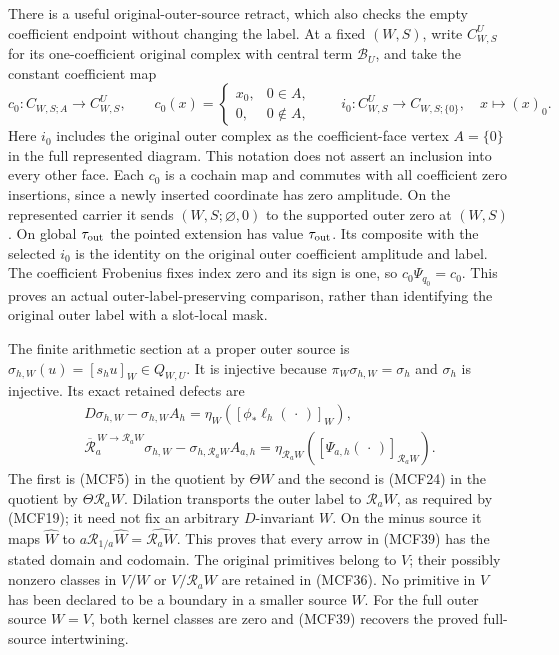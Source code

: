 \documentclass[11pt,a4paper]{article}
\begin{document}
There is a useful original-outer-source retract, which also checks the
empty coefficient endpoint without changing the label.  At a fixed
$(W,S)$, write $C_{W,S}^U$ for its one-coefficient original complex
with central term $\mathscr B_U$, and take the constant coefficient map
\[
c_0:C_{W,S;A}\longrightarrow C_{W,S}^U,\qquad
c_0(x)=\begin{cases}x_0,&0\in A,\\0,&0\notin A,
\end{cases}
\qquad
i_0:C_{W,S}^U\longrightarrow C_{W,S;\{0\}},\quad x\longmapsto(x)_0.
\tag{MCF38}
\]
Here $i_0$ includes the original outer complex as the coefficient-face
vertex $A=\{0\}$ in the full represented diagram.  This notation does
not assert an inclusion into every other face.  Each $c_0$ is a cochain
map and commutes with all coefficient zero insertions, since a newly
inserted coordinate has zero amplitude.  On the represented carrier
it sends $(W,S;\varnothing,0)$ to the supported outer zero at
$(W,S)$.  On global $\tau_{\rm out}$ the pointed extension
has value $\tau_{\rm out}$.  Its composite with the selected $i_0$
is the identity on the original outer coefficient amplitude and label.
The coefficient Frobenius fixes index zero and its sign is one, so
$c_0\Psi_{q_0}=c_0$.  This proves an actual outer-label-preserving
comparison, rather than identifying the original outer label with a
slot-local mask.

The finite arithmetic section at a proper outer source is
$\sigma_{h,W}(u)=[s_hu]_W\in Q_{W,U}$.  It is injective because
$\pi_W\sigma_{h,W}=\sigma_h$ and $\sigma_h$ is injective.
Its exact retained defects are
\[
\begin{gathered}
D\sigma_{h,W}-\sigma_{h,W}A_h
       =\eta_W([\phi_*\ell_h(\,\cdot\,)]_W),\\
\overline{\mathcal R}_a^{\,W\to\mathcal R_aW}\sigma_{h,W}
       -\sigma_{h,\mathcal R_aW}A_{a,h}
       =\eta_{\mathcal R_aW}([\Psi_{a,h}(\,\cdot\,)]_{\mathcal R_aW}).
\end{gathered}
\tag{MCF39}
\]
The first is (MCF5) in the quotient by $\Theta W$ and the second is
(MCF24) in the quotient by $\Theta\mathcal R_aW$.  Dilation transports
the outer label to $\mathcal R_aW$, as required by (MCF19); it need
not fix an arbitrary $D$-invariant $W$.  On the minus source it maps
$\widehat W$ to $a\mathcal R_{1/a}\widehat W=
\widehat{\mathcal R_aW}$.  This proves that every arrow in (MCF39)
has the stated domain and codomain.  The original primitives belong
to $V$; their possibly nonzero classes in $V/W$ or
$V/\mathcal R_aW$ are retained in (MCF36).  No primitive in $V$ has
been declared to be a boundary in a smaller source $W$.
For the full outer source $W=V$, both kernel classes are zero and
(MCF39) recovers the proved full-source intertwining.
\end{document}

